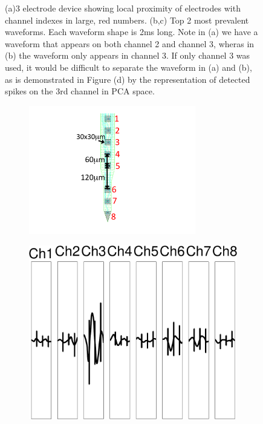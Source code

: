 \begin{center}
\begin{figure}
\begin{subfigure}[b]{.28\textwidth}
\caption{}
\label{3chpca}
\end{subfigure}
\caption{(a)3 electrode device showing local proximity of electrodes with channel indexes in large, red numbers. (b,c) Top 2 most prevalent waveforms.  Each waveform shape is 2ms long.   Note in (a) we have a waveform that appears on both channel 2 and channel 3, wheras in (b) the waveform only appears in channel 3.  If only channel 3 was used, it would be difficult to separate the waveform in (a) and (b), as is demonstrated in Figure (d) by the representation of detected spikes on the 3rd channel in PCA space.}
\end{figure}
\end{center}
\begin{center}
\begin{figure}[h!]
\begin{subfigure}[b]{.12\textwidth}
\includegraphics[width=0.8\textwidth]{../figs/8dev}
\caption{}
\label{3dev}
\end{subfigure}
\begin{subfigure}[b]{.28\textwidth}
\includegraphics[width=\textwidth]{../figs/8devim/clus3}

\end{subfigure}
\end{figure}
\end{center}
